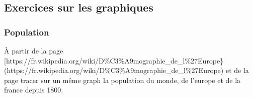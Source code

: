 \documentclass[letterpaper,10pt,english]{sphinxhowto}
\begin{document}
\subsection{Exercices sur les graphiques}
\label{\detokenize{cours7_graphiques_corr_exercices:exercices-sur-les-graphiques}}\label{\detokenize{cours7_graphiques_corr_exercices::doc}}

\subsubsection{Population}
\label{\detokenize{cours7_graphiques_corr_exercices:population}}
\sphinxAtStartPar
À partir de la page {[}https://fr.wikipedia.org/wiki/D\%C3\%A9mographie\_de\_l\%27Europe\}(https://fr.wikipedia.org/wiki/D\%C3\%A9mographie\_de\_l\%27Europe) et de la page  tracer sur un même graph la population du monde, de l’europe et de la france depuis 1800.
\end{document}
